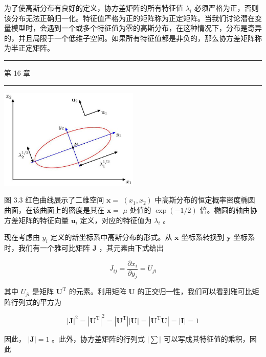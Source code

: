 \documentclass[10pt]{report}
\newcommand{\HRule}{\begin{center}\rule{0.9\linewidth}{0.2mm}\end{center}}
\begin{document}
为了使高斯分布有良好的定义，协方差矩阵的所有特征值 \({\lambda }_{i}\) 必须严格为正，否则该分布无法正确归一化。特征值严格为正的矩阵称为正定矩阵。当我们讨论潜在变量模型时，会遇到一个或多个特征值为零的高斯分布，在这种情况下，分布是奇异的，并且局限于一个低维子空间。如果所有特征值都是非负的，那么协方差矩阵称为半正定矩阵。

\HRule

第 16 章

\HRule

\begin{center}
\includegraphics[max width=0.5\textwidth]{images/0194e279-9b28-703a-88f4-c3ac21e2010d_92_854_346_691_497_0.jpg}
\end{center}
\hspace*{3em} 

图 3.3 红色曲线展示了二维空间 \(\mathbf{x} =\)  \(\left( {{x}_{1},{x}_{2}}\right)\) 中高斯分布的恒定概率密度椭圆曲面，在该曲面上的密度是其在 \(\mathbf{x} =\)  \(\mu\) 处值的 \(\exp \left( {-1/2}\right)\) 倍。椭圆的轴由协方差矩阵的特征向量 \({\mathbf{u}}_{i}\) 定义，对应的特征值为 \({\lambda }_{i}\) 。

现在考虑由 \({y}_{i}\) 定义的新坐标系中高斯分布的形式。从 \(\mathbf{x}\) 坐标系转换到 \(\mathbf{y}\) 坐标系时，我们有一个雅可比矩阵 \(\mathbf{J}\) ，其元素由下式给出

\[
{J}_{ij} = \frac{\partial {x}_{i}}{\partial {y}_{j}} = {U}_{ji} \tag{3.36}
\]

其中 \({U}_{ji}\) 是矩阵 \({\mathbf{U}}^{\mathrm{T}}\) 的元素。利用矩阵 \(\mathbf{U}\) 的正交归一性，我们可以看到雅可比矩阵行列式的平方为

\[
{\left| \mathbf{J}\right| }^{2} = {\left| {\mathbf{U}}^{\mathrm{T}}\right| }^{2} = \left| {\mathbf{U}}^{\mathrm{T}}\right| \left| \mathbf{U}\right|  = \left| {{\mathbf{U}}^{\mathrm{T}}\mathbf{U}}\right|  = \left| \mathbf{I}\right|  = 1 \tag{3.37}
\]

因此， \(\left| \mathbf{J}\right|  = 1\) 。此外，协方差矩阵的行列式 \(\left| \mathbf{\sum }\right|\) 可以写成其特征值的乘积，因此
\end{document}

